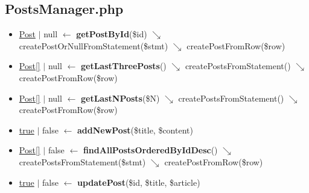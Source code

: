 \subsection{PostsManager.php}
\begin{itemize}
  \setlength\itemsep{0em}
  \item \underline{Post} $\vert$ null $\leftarrow$ \textbf{getPostById}(\$id) $\searrow$ createPostOrNullFromStatement(\$stmt) $\searrow$ createPostFromRow(\$row)
  \item \underline{Post[]} $\vert$ null $\leftarrow$ \textbf{getLastThreePosts}() $\searrow$ createPostsFromStatement() $\searrow$ createPostFromRow(\$row)
  \item \underline{Post[]} $\vert$ null $\leftarrow$ \textbf{getLastNPosts}(\$N) $\searrow$ createPostsFromStatement() $\searrow$ createPostFromRow(\$row)
  \item \underline{true} $\vert$ false $\leftarrow$ \textbf{addNewPost}(\$title, \$content)
  \item \underline{Post[]} $\vert$ false $\leftarrow$ \textbf{findAllPostsOrderedByIdDesc}() $\searrow$ createPostsFromStatement(\$stmt) $\searrow$ createPostFromRow(\$row)
  \item \underline{true} $\vert$ false $\leftarrow$ \textbf{updatePost}(\$id, \$title, \$article)
\end{itemize}
